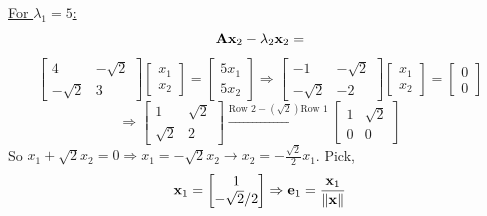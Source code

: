 \begin{enumerate}[font=\bfseries]
        \underline{For $\lambda_1 = 5$:}
        \[
            \bold{A}\bold{x}_2 - \lambda_2\bold{x}_2
            =
        \]
        \[
            \begin{bmatrix}
                4 & -\sqrt{2} \\
                -\sqrt{2} & 3
            \end{bmatrix}
            \begin{bmatrix}
                x_1 \\
                x_2
            \end{bmatrix}
            =
            \begin{bmatrix}
                5x_1 \\
                5x_2
            \end{bmatrix}
            \Rightarrow
            \begin{bmatrix}
                -1 & -\sqrt{2} \\
                -\sqrt{2} & -2
            \end{bmatrix}
            \begin{bmatrix}
                x_1 \\
                x_2
            \end{bmatrix}
            =
            \begin{bmatrix}
                0 \\
                0
            \end{bmatrix}
        \]
        \[
            \Rightarrow
            \begin{bmatrix}
                1 & \sqrt{2} \\
                \sqrt{2} & 2
            \end{bmatrix}
            \overset{\text{Row 2} - \left(\sqrt{2}\right)\text{Row 1}}{\longrightarrow}
            \begin{bmatrix}
                1 & \sqrt{2} \\
                0 & 0
            \end{bmatrix}
        \]
        So $x_1 + \sqrt{2}x_2 = 0 \Rightarrow x_1 = -\sqrt{2}x_2 \rightarrow x_2 = -\frac{\sqrt{2}}{2}x_1$. Pick,
        \[
            \bold{x}_1 
            =
            \begin{bmatrix}
                1 \\
                -\sqrt{2}/2
            \end{bmatrix}
            \Rightarrow
            \bold{e}_1
            =
            \frac{\bold{x}_1}{\left\|\bold{x}\right\|}
\]
\end{enumerate}

